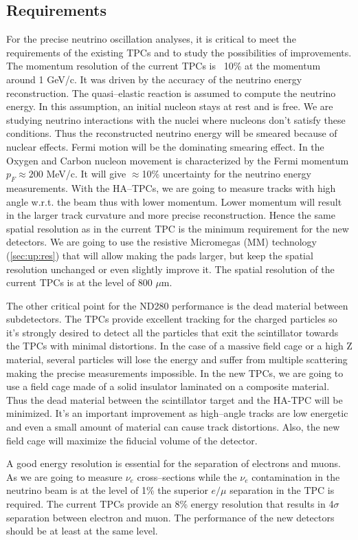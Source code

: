 \documentclass[../main.tex]{subfiles}
\begin{document}
\subsection{Requirements}
For the precise neutrino oscillation analyses, it is critical to meet the requirements of the existing TPCs and to study the possibilities of improvements. The momentum resolution of the current TPCs is ~10\% at the momentum around 1 GeV/c. It was driven by the accuracy of the neutrino energy reconstruction. The quasi--elastic reaction is assumed to compute the neutrino energy. In this assumption, an initial nucleon stays at rest and is free. We are studying neutrino interactions with the nuclei where nucleons don't satisfy these conditions. Thus the reconstructed neutrino energy will be smeared because of nuclear effects. Fermi motion will be the dominating smearing effect. In the Oxygen and Carbon nucleon movement is characterized by the Fermi momentum $p_F\approx 200$ MeV/c. It will give $\approx$10\% uncertainty for the neutrino energy measurements. With the HA--TPCs, we are going to measure tracks with high angle w.r.t. the beam thus with lower momentum. Lower momentum will result in the larger track curvature and more precise reconstruction. Hence the same spatial resolution as in the current TPC is the minimum requirement for the new detectors. We are going to use the resistive Micromegas (MM) technology (\autoref{sec:up:res}) that will allow making the pads larger, but keep the spatial resolution unchanged or even slightly improve it. The spatial resolution of the current TPCs is at the level of 800 $\mu\text{m}$.

The other critical point for the ND280 performance is the dead material between subdetectors. The TPCs provide excellent tracking for the charged particles so it's strongly desired to detect all the particles that exit the scintillator towards the TPCs with minimal distortions. In the case of a massive field cage or a high Z material, several particles will lose the energy and suffer from multiple scattering making the precise measurements impossible. In the new TPCs, we are going to use a field cage made of a solid insulator laminated on a composite material. Thus the dead material between the scintillator target and the HA-TPC will be minimized. It's an important improvement as high--angle tracks are low energetic and even a small amount of material can cause track distortions. Also, the new field cage will maximize the fiducial volume of the detector.

A good energy resolution is essential for the separation of electrons and muons. As we are going to measure $\nu_e$ cross--sections while the $\nu_e$ contamination in the neutrino beam is at the level of 1\% the superior $e/\mu$ separation in the TPC is required. The current TPCs provide an 8\% energy resolution that results in 4$\sigma$ separation between electron and muon. The performance of the new detectors should be at least at the same level.
\end{document}
